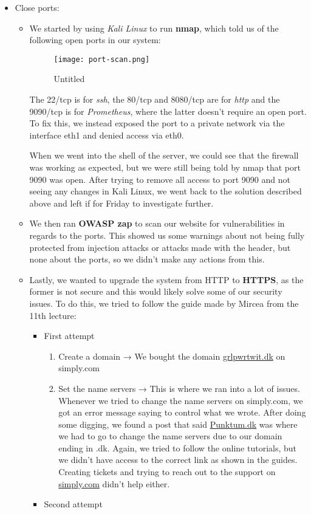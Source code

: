 \begin{itemize}
\item Close ports:

    \begin{itemize}
        \item We started by using \emph{Kali Linux} to run \textbf{nmap}, which told us of the following open ports in our system:
        \begin{figure}
        \centering
        \texttt{[image: port-scan.png]}
        \caption{Untitled}
        \end{figure}
        The 22/tcp is for \emph{ssh}, the 80/tcp and 8080/tcp are for \emph{http} and the 9090/tcp is for \emph{Prometheus}, where the latter doesn't require an open port. To fix this, we instead exposed the port to a private network via the interface eth1 and denied access via eth0.

        When we went into the shell of the server, we could see that the firewall was working as expected, but we were still being told by nmap that port 9090 was open. After trying to remove all access to port 9090 and not seeing any changes in Kali Linux, we went back to the solution described above and left if for Friday to investigate further.

        \item We then ran \textbf{OWASP zap} to scan our website for vulnerabilities in regards to the ports. This showed us some warnings about not being fully protected from injection attacks or attacks made with the header, but none about the ports, so we didn't make any actions from this.
        \item Lastly, we wanted to upgrade the system from HTTP to \textbf{HTTPS}, as the former is not secure and this would likely solve some of our security issues. To do this, we tried to follow the guide made by Mircea from the 11th lecture:

        \begin{itemize}
            \item First attempt

            \begin{enumerate}
                \item Create a domain → We bought the domain \href{http://grlpwrtwit.dk}{grlpwrtwit.dk} on simply.com
                \item Set the name servers → This is where we ran into a lot of issues. Whenever we tried to change the name servers on simply.com, we got an error message saying to control what we wrote. After doing some digging, we found a post that said \href{http://Punktum.dk}{Punktum.dk} was where we had to go to change the name servers due to our domain ending in .dk. Again, we tried to follow the online tutorials, but we didn't have access to the correct link as shown in the guides.
                Creating tickets and trying to reach out to the support on      \href{http://simply.com}{simply.com} didn't help either.
            \end{enumerate}
            \item Second attempt


\end{itemize}
\end{itemize}
\end{itemize}
